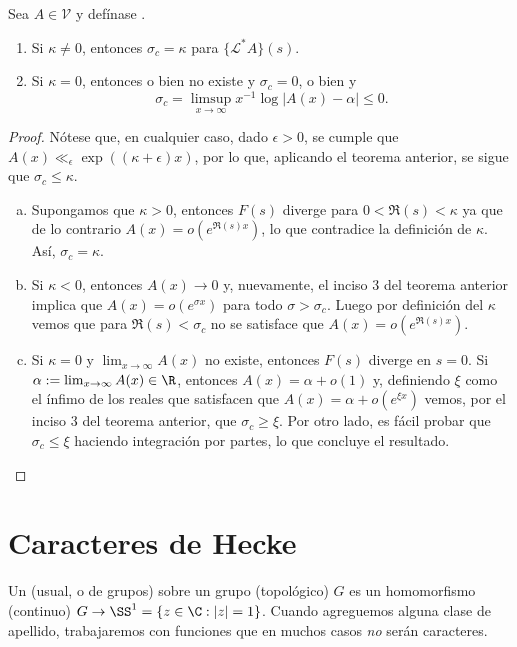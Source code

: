 \documentclass[teoria-numeros.tex]{subfiles}
\begin{document}
\begin{thm}
	Sea $A \in \mathcal{V}$ y defínase .
	\begin{enumerate}
		\item Si $\kappa \ne 0$, entonces $\sigma_c = \kappa$ para $\{ \mathcal{L}^*A \}(s)$.
		\item Si $\kappa = 0$, entonces o bien  no existe y $\sigma_c = 0$,
			o bien  y
			\[
				\sigma_c = \limsup_{x \to \infty} x^{-1}\log|A(x) - \alpha| \le 0.
			\]
	\end{enumerate}
\end{thm}
\begin{proof}
	Nótese que, en cualquier caso, dado $\epsilon > 0$, se cumple que $A(x) \ll_\epsilon \exp((\kappa + \epsilon)x)$, por lo que,
	aplicando el teorema anterior, se sigue que $\sigma_c \le \kappa$.
	\begin{enumerate}[(a)]
		\item Supongamos que $\kappa > 0$, entonces $F(s)$ diverge para $0 < \Re(s) < \kappa$ ya que de lo contrario $A(x) = o(e^{\Re(s)x})$,
			lo que contradice la definición de $\kappa$.
			Así, $\sigma_c = \kappa$.
		\item Si $\kappa < 0$, entonces $A(x) \to 0$ y, nuevamente, el inciso 3 del teorema anterior implica que $A(x) = o(e^{\sigma x})$
			para todo $\sigma > \sigma_c$.
			Luego por definición del $\kappa$ vemos que para $\Re(s) < \sigma_c$ no se satisface que $A(x) = o(e^{\Re(s)x})$.
		\item Si $\kappa = 0$ y $\lim_{x \to \infty} A(x)$ no existe, entonces $F(s)$ diverge en $s = 0$.
			Si $\alpha := \lim_{x \to \infty} A(x) \in \R$, entonces $A(x) = \alpha + o(1)$ y, definiendo $\xi$ como el ínfimo
			de los reales que satisfacen que $A(x) = \alpha + o(e^{\xi x})$ vemos, por el inciso 3 del teorema anterior,
			que $\sigma_c \ge \xi$.
			Por otro lado, es fácil probar que $\sigma_c \le \xi$ haciendo integración por partes, lo que concluye el resultado.
			\qedhere
	\end{enumerate}
\end{proof}

\section{Caracteres de Hecke}
Un  (usual, o de grupos) sobre un grupo (topológico) $G$ es
un homomorfismo (continuo) $G \to \SS^1 = \{ z \in \C : |z| = 1 \}$.
Cuando agreguemos alguna clase de apellido, trabajaremos con funciones que en muchos casos \textit{no} serán caracteres.
\end{document}
